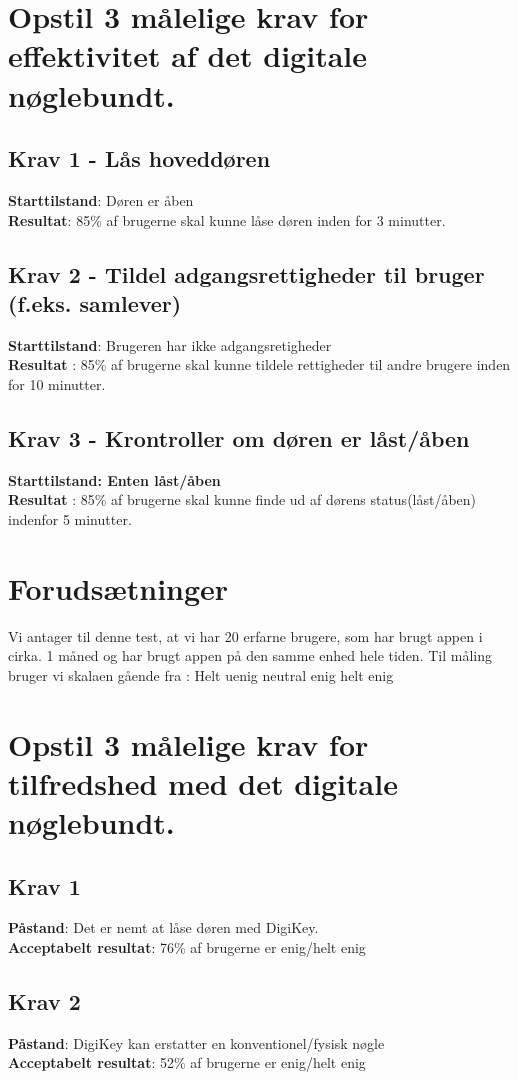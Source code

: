 \documentclass[12pt]{article}
\begin{document}
\section*{Opstil 3 målelige krav for effektivitet af det digitale nøglebundt.}
\subsection*{Krav 1 - Lås hoveddøren}
\textbf{Starttilstand}: Døren er åben\\
\textbf{Resultat}: 85\% af brugerne skal kunne låse døren inden for 3 minutter.
\subsection*{Krav 2 - Tildel adgangsrettigheder til bruger (f.eks. samlever)}
\textbf{Starttilstand}: Brugeren har ikke adgangsretigheder\\
\textbf{Resultat} : 85\% af brugerne skal kunne tildele rettigheder til andre brugere inden for 10 minutter.
\subsection*{Krav 3 - Krontroller om døren er låst/åben}
\textbf{Starttilstand: Enten l\aa st/\aa ben}\\
\textbf{Resultat} : 85\% af brugerne skal kunne finde ud af dørens status(låst/åben) indenfor 5 minutter.\newpage
\section*{Forudsætninger}
Vi antager til denne test, at vi har 20 erfarne brugere, som har brugt appen i cirka. 1 måned og har brugt appen på den samme enhed hele tiden.
Til måling bruger vi skalaen gående fra : Helt uenig neutral enig helt enig\\
\section*{Opstil 3 målelige krav for tilfredshed med det digitale nøglebundt.}
\subsection*{Krav 1}
\textbf{Påstand}: Det er nemt at låse døren med DigiKey.\\
\textbf{Acceptabelt resultat}: 76\% af brugerne er enig/helt enig
\subsection*{Krav 2}
\textbf{Påstand}: DigiKey kan erstatter en konventionel/fysisk nøgle\\
\textbf{Acceptabelt resultat}: 52\% af brugerne er enig/helt enig
\end{document}
